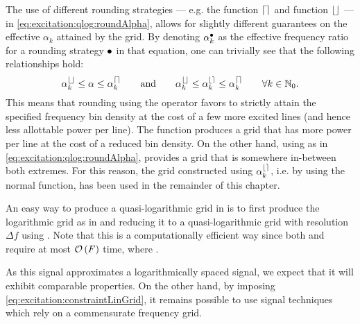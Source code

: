   \begin{remark}
  The use of different rounding strategies --- e.g. the  function $\left\lceil  \right\rceil$  and  function $\left\lfloor  \right\rfloor$ --- in \eqref{eq:excitation:qlog:roundAlpha}, allows for slightly different guarantees on the effective $\alpha_k$ attained by the grid.
  By denoting $\alpha_k^{\bullet}$ as the effective frequency ratio for a rounding strategy $\bullet$  in that equation, one can trivially see that the following relationships hold:
  \begin{equation}
  \alpha_k^{\left\lfloor  \right\rfloor} \leq \alpha \leq  \alpha_k^{\left\lceil  \right\rceil}
  \qquad \text{and} \qquad
  \alpha_k^{\left\lfloor  \right\rfloor} \leq \alpha_k^{\left\lfloor  \right\rceil} \leq  \alpha_k^{\left\lceil  \right\rceil}
  \qquad
  \forall k \in \mathbb{N}_{0}
  \text{.}
  \end{equation}
  This means that rounding using the  operator favors to strictly attain the specified frequency bin density at the cost of a few more excited lines (and hence less allottable power per line).
  The  function produces a grid that has more power per line at the cost of a reduced bin density.
  On the other hand, using  as in \eqref{eq:excitation:qlog:roundAlpha}, provides a grid that is somewhere in-between both extremes.
  For this reason, the grid constructed using $\alpha_k^{\left\lfloor  \right\rceil}$, i.e. by using the normal  function, has been used in the remainder of this chapter.
  \end{remark}

  \begin{example} \label{eg:excitation:quasilogarithmicGrid:matlab}
  An easy way to produce a quasi-logarithmic grid in \MATLAB is to first produce the logarithmic grid  as in   and reducing it to a quasi-logarithmic grid with resolution $\Delta f$ using .
  Note that this is a computationally efficient way since both  and  require at most $\mathcal{O} \left(  F  \right)$ time, where .
  \end{example}

  As this signal approximates a logarithmically spaced signal,  we expect that it will exhibit comparable properties.
  On the other hand, by imposing \eqref{eq:excitation:constraintLinGrid}, it remains
  possible to use signal techniques which rely on a commensurate frequency grid.

